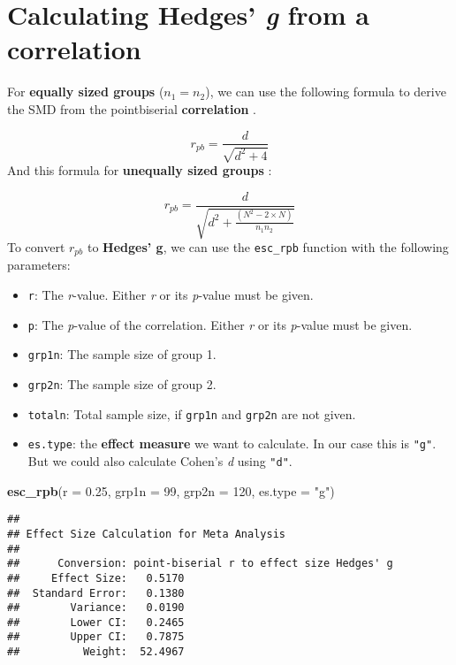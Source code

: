 \documentclass[]{book}
\newenvironment{Shaded}{\begin{snugshade}}{\end{snugshade}}
\newcommand{\KeywordTok}[1]{\textcolor[rgb]{0.13,0.29,0.53}{\textbf{#1}}}
\newcommand{\DataTypeTok}[1]{\textcolor[rgb]{0.13,0.29,0.53}{#1}}
\newcommand{\DecValTok}[1]{\textcolor[rgb]{0.00,0.00,0.81}{#1}}
\newcommand{\FloatTok}[1]{\textcolor[rgb]{0.00,0.00,0.81}{#1}}
\newcommand{\StringTok}[1]{\textcolor[rgb]{0.31,0.60,0.02}{#1}}
\newcommand{\NormalTok}[1]{#1}
\providecommand{\tightlist}{%
  \setlength{\itemsep}{0pt}\setlength{\parskip}{0pt}}
\theoremstyle{definition}
\theoremstyle{definition}
\theoremstyle{definition}
\theoremstyle{remark}
\begin{document}
\hypertarget{f}{\section{\texorpdfstring{Calculating Hedges' \emph{g}
from a correlation}{Calculating Hedges' g from a correlation}}\label{f}}

For \textbf{equally sized groups} (\(n_1=n_2\)), we can use the
following formula to derive the SMD from the pointbiserial
\textbf{correlation} \citep{rosenthal1984meta}.

\[r_{pb} = \frac{d}{\sqrt{d^2+4}}\] And this formula for
\textbf{unequally sized groups} \citep{aaron1998equating}:

\[r_{pb} = \frac{d}{\sqrt{d^2+  \frac{(N^2-2 \times N)}{n_1 n_2} }}\] To
convert \(r_{pb}\) to \textbf{Hedges' g}, we can use the
\texttt{esc\_rpb} function with the following parameters:

\begin{itemize}
\tightlist
\item
  \texttt{r}: The \emph{r}-value. Either \emph{r} or its \emph{p}-value
  must be given.
\item
  \texttt{p}: The \emph{p}-value of the correlation. Either \emph{r} or
  its \emph{p}-value must be given.
\item
  \texttt{grp1n}: The sample size of group 1.
\item
  \texttt{grp2n}: The sample size of group 2.
\item
  \texttt{totaln}: Total sample size, if \texttt{grp1n} and
  \texttt{grp2n} are not given.
\item
  \texttt{es.type}: the \textbf{effect measure} we want to calculate. In
  our case this is \texttt{"g"}. But we could also calculate Cohen's
  \emph{d} using \texttt{"d"}.
\end{itemize}

\begin{Shaded}
\begin{Highlighting}[]
\KeywordTok{esc_rpb}\NormalTok{(}\DataTypeTok{r =} \FloatTok{0.25}\NormalTok{, }\DataTypeTok{grp1n =} \DecValTok{99}\NormalTok{, }\DataTypeTok{grp2n =} \DecValTok{120}\NormalTok{, }\DataTypeTok{es.type =} \StringTok{"g"}\NormalTok{)}
\end{Highlighting}
\end{Shaded}

\begin{verbatim}
## 
## Effect Size Calculation for Meta Analysis
## 
##      Conversion: point-biserial r to effect size Hedges' g
##     Effect Size:   0.5170
##  Standard Error:   0.1380
##        Variance:   0.0190
##        Lower CI:   0.2465
##        Upper CI:   0.7875
##          Weight:  52.4967
\end{verbatim}
\end{document}
